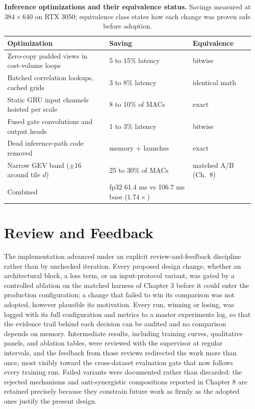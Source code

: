 \begin{table}[!htbp]
\centering
\caption{\textbf{Inference optimizations and their equivalence status.} Savings measured at $384\times 640$ on RTX 3050; equivalence class states how each change was proven safe before adoption.}
\label{tab:efficiency_findings}
\small
\begin{tabular}{p{5.6cm}p{4.2cm}l}
\toprule
Optimization & Saving & Equivalence\\
\midrule
Zero-copy padded views in cost-volume loops & 5 to 15\% latency & bitwise\\
Batched correlation lookups, cached grids & 3 to 8\% latency & identical math\\
Static GRU input channels hoisted per scale & 8 to 10\% of MACs & exact\\
Fused gate convolutions and output heads & 1 to 3\% latency & bitwise\\
Dead inference-path code removed & memory + launches & exact\\
Narrow GEV band ($\pm 16$ around tile $d$) & 25 to 30\% of MACs & matched A/B (Ch.~8)\\
\midrule
Combined & fp32 61.4 ms vs 106.7 ms base ($1.74\times$) & \\
\bottomrule
\end{tabular}
\end{table}

\FloatBarrier
\section{Review and Feedback}
The implementation advanced under an explicit review-and-feedback
discipline rather than by unchecked iteration. Every proposed design
change, whether an architectural block, a loss term, or an input-protocol
variant, was gated by a controlled ablation on the matched harness of
Chapter 3 before it could enter the production configuration; a change
that failed to win its comparison was not adopted, however plausible its
motivation. Every run, winning or losing, was logged with its full
configuration and metrics to a master experiments log, so that the
evidence trail behind each decision can be audited and no comparison
depends on memory. Intermediate results, including training curves,
qualitative panels, and ablation tables, were reviewed with the
supervisor at regular intervals, and the feedback from those reviews
redirected the work more than once, most visibly toward the
cross-dataset evaluation gate that now follows every training run.
Failed variants were documented rather than discarded: the rejected
mechanisms and anti-synergistic compositions reported in Chapter 8 are
retained precisely because they constrain future work as firmly as the
adopted ones justify the present design.


